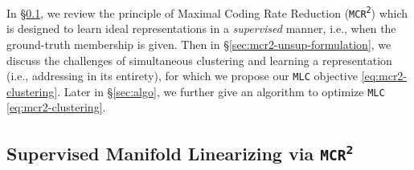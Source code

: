 \documentclass[10pt,twocolumn,letterpaper]{article}
\newcommand{\ours}{MLC}
\newcommand{\mours}{\texttt{\ours}}
\newcommand{\mcr}{\texttt{MCR\textsuperscript{2}}}
\begin{document}
   In \S \ref{sec:mcr2}, we review the principle of Maximal Coding Rate Reduction (\mcr{}) which is designed to learn ideal representations in a \textit{supervised} manner, i.e., when the ground-truth membership is given. Then in \S \ref{sec:mcr2-unsup-formulation}, we discuss the challenges of simultaneous clustering and learning a representation (i.e., addressing  in its entirety), for which we propose our \mours{} objective \eqref{eq:mcr2-clustering}. Later in \S \ref{sec:algo}, we further give an algorithm to optimize \mours{} \eqref{eq:mcr2-clustering}. 

   
   \subsection{Supervised Manifold Linearizing via \bf{\mcr{}}} \label{sec:mcr2}
   \newcommand{\Rexp}{R(\mZ;\,\epsilon)}
   \newcommand{\Rcom}[1]{R_c(\mZ,#1;\,\epsilon)}
   \def\txtmcrobj{
   \underbrace{\log\det\left(\mI + \frac{d}{n\epsilon^2} \mZ \mZ^\top \right)}_{\Rexp} - \underbrace{\sum_{j=1}^{k} \frac{\langle \bPi_j, \vone \rangle}{n}\log\det\left(\mI + \frac{d}{\langle \bPi_j, \vone \rangle \epsilon^2} \mZ \Diag(\bPi_j) \mZ^\top \right)}_{\Rcom{\bPi}}
   }
   \def\txtmcrunitnorm{
   \mZ = f_{\btheta}(\mX) 
   }
\end{document}
